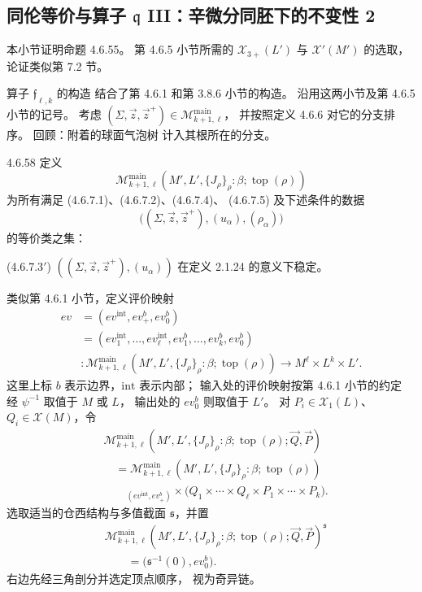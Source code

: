 
\subsection{同伦等价与算子 $\mathfrak q$ III：辛微分同胚下的不变性 2}
\label{subsec:4-6-6}

本小节证明命题 4.6.55。
第 4.6.5 小节所需的
$\mathcal X_{3+}(L')$ 与 $\mathcal X'(M')$
的选取，论证类似第 7.2 节。

算子 $\mathfrak f_{\ell,k}$ 的构造
结合了第 4.6.1 和第 3.8.6 小节的构造。
沿用这两小节及第 4.6.5 小节的记号。
考虑
$(\Sigma,\vec z,\vec z^+)
\in\mathcal M_{k+1,\ell}^{\mathrm{main}}$，
并按照定义 4.6.6 对它的分支排序。
回顾：附着的球面气泡树
计入其根所在的分支。

\begin{definition}{4.6.58}\label{def:4-6-58}
定义
\[
\mathcal M_{k+1,\ell}^{\mathrm{main}}
(M',L',\{J_\rho\}_\rho:\beta;\operatorname{top}(\rho))
\]
为所有满足
(4.6.7.1)、(4.6.7.2)、(4.6.7.4)、
(4.6.7.5) 及下述条件的数据
\[
\bigl((\Sigma,\vec z,\vec z^+),
      (u_\alpha),(\rho_\alpha)\bigr)
\]
的等价类之集：

\noindent\textup{(4.6.7.3$'$)}
$((\Sigma,\vec z,\vec z^+),(u_\alpha))$
在定义 2.1.24 的意义下稳定。
\end{definition}

类似第 4.6.1 小节，定义评价映射
\[
\begin{aligned}
ev
&=(ev^{\mathrm{int}},ev_+^b,ev_0^b)\\
&=(ev_1^{\mathrm{int}},\ldots,ev_\ell^{\mathrm{int}},
   ev_1^b,\ldots,ev_k^b,ev_0^b)\\
&\colon
\mathcal M_{k+1,\ell}^{\mathrm{main}}
(M',L',\{J_\rho\}_\rho:\beta;\operatorname{top}(\rho))
\longrightarrow M^\ell\times L^k\times L'.
\end{aligned}
\]
这里上标 $b$ 表示边界，$\mathrm{int}$ 表示内部；
输入处的评价映射按第 4.6.1 小节的约定
经 $\psi^{-1}$ 取值于 $M$ 或 $L$，
输出处的 $ev_0^b$ 则取值于 $L'$。
对 $P_i\in\mathcal X_1(L)$、
$Q_i\in\mathcal X(M)$，令
\[
\begin{aligned}
&\mathcal M_{k+1,\ell}^{\mathrm{main}}
(M',L',\{J_\rho\}_\rho:\beta;\operatorname{top}(\rho);
 \vec Q,\vec P)\\
&\quad=
\mathcal M_{k+1,\ell}^{\mathrm{main}}
(M',L',\{J_\rho\}_\rho:\beta;\operatorname{top}(\rho))\\[-1mm]
&\qquad{}_{(ev^{\mathrm{int}},ev_+^b)}\!\times
\bigl(Q_1\times\cdots\times Q_\ell
      \times P_1\times\cdots\times P_k\bigr).
\end{aligned}
\]
选取适当的仓西结构与多值截面
$\mathfrak s$，并置
\[
\begin{aligned}
&\mathcal M_{k+1,\ell}^{\mathrm{main}}
(M',L',\{J_\rho\}_\rho:\beta;\operatorname{top}(\rho);
 \vec Q,\vec P)^{\mathfrak s}\\
&\qquad=
\bigl(\mathfrak s^{-1}(0),ev_0^b\bigr).
\end{aligned}
\]
右边先经三角剖分并选定顶点顺序，
视为奇异链。

